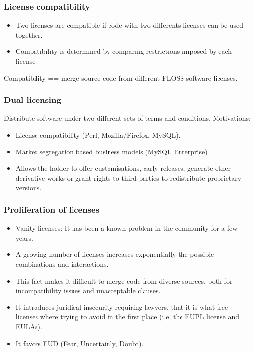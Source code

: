 
\begin{frame}
\frametitle{License compatibility}

\begin{itemize}
\item Two licenses are compatible if code with two differents licenses can be used together.
\item Compatibility is determined by comparing restrictions imposed by each license.
\end{itemize}

Compatibility == merge source code from different FLOSS software licenses.

\end{frame}


\begin{frame}
\frametitle{Dual-licensing}

Distribute software under two different sets of terms and conditions. Motivations:

\begin{itemize}
\item License compatibility (Perl, Mozilla/Firefox, MySQL).
\item Market segregation based business models (MySQL Enterprise)
\item Allows the holder to offer customisations, early releases, generate other derivative works or grant rights to third parties to redistribute proprietary versions.
\end{itemize}

                                                 
\end{frame}


\begin{frame}
\frametitle{Proliferation of licenses}

\begin{itemize}
\item Vanity licenses: It has been a known problem in the community for a few years.
\item A growing number of licenses increases exponentially the possible combinations and interactions. 
\item This fact makes it difficult to merge code from diverse sources, both for incompatibility issues and unacceptable clauses.
\item It introduces juridical insecurity requiring lawyers, that it is what free licenses where trying to avoid in the first place (i.e. the EUPL license and EULAs).
\item It favors FUD (Fear, Uncertainly, Doubt).
\end{itemize}                                                 

\end{frame}



